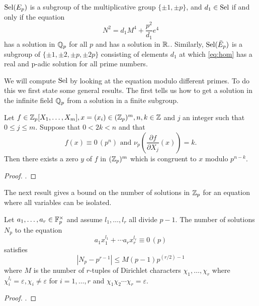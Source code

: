 \documentclass[12pt, a4paper]{amsart}
\begin{document}
\begin{prop}
  $\text{\normalfont Sel}(E_p)$ is a subgroup of the multiplicative group
  $ \{ \pm 1, \pm p \}$, and $d_1 \in \text{\normalfont Sel}$ if and only if the equation
  \begin{equation} \label{eq:hom}
    N^2 = d_1 M^4 + \frac{p^2}{d_1}e^4
  \end{equation}
  has a solution in ${\mathbb Q}_p$ for all $p$ and has a solution in ${\mathbb R}.$.
  Similarly, $\text{\normalfont Sel}(\bar{E}_p)$ is a subgroup of $\{\pm 1, \pm 2, \pm p, \pm 2p\}$
  consisting of elements $d_1$ at which \ref{eq:hom} has a real and p-adic
  solution for all prime numbers.
\end{prop}

We will compute $\text{\normalfont Sel}$ by looking at the equation modulo different primes.
To do this we first state some general results. The first tells us
how to get a solution in the infinite field ${\mathbb Q}_p$ from a solution in a finite
subgroup.

\begin{prop}
  Let $f \in {\mathbb Z}_p[X_1,\dots,X_m], x = (x_i) \in ({\mathbb Z}_p)^m, n, k \in {\mathbb Z}$ and
  $j$ an integer such that $0 \leq j \leq m$. Suppose that $0 < 2k < n$ and that
  \[ f(x) \equiv 0 \, (p^n) \text { and } \nu_p
    \left(\frac{\partial f}{\partial X_j} (x) \right) = k.\]
  Then there exists a zero $y$ of $f$ in $({\mathbb Z}_p)^m$ which is congruent to $x$
  modulo $p^{n-k}$.
\end{prop}
\begin{proof}
  \cite[See][Chapter 2-2, page 14]{Serre}.
\end{proof}

The next result gives a bound on the number of solutions in ${\mathbb Z}_p$ for an equation
where all variables can be isolated.

\begin{prop} \label{prop:countsols}
  Let $a_1, \dots, a_r \in \mathbb{F}_p^\times$ and assume $l_1, \dots, l_r$ all divide
  $p-1$.
  The number of solutions $N_p$ to the equation
  \[a_1x_1^{l_1} + \cdots a_rx_r^{l_r} \equiv 0 \, (p)\]
  satisfies
  \begin{equation} 
    |N_p - p^{r-1}| \leq M(p-1)p^{(r/2)-1}
  \end{equation} 
  where $M$ is the number of $r$-tuples
  of Dirichlet characters
  $\chi_1, \dots , \chi_r$
  where $\chi_i^{l_i} = \varepsilon, \chi_i \neq \varepsilon$ for
  $i = 1, \dots, r$ and $\chi_1 \chi_2 \cdots \chi_r = \varepsilon$.
\end{prop} 
\begin{proof}
  \cite[See][Chapter 8-7, page 103]{classical}.
\end{proof}
\end{document}
